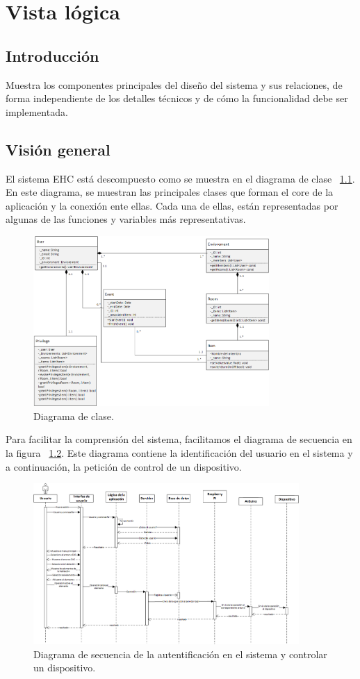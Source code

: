 \chapter{Vista l\'ogica}
\section{Introducci\'on}
Muestra los componentes principales del dise\~no del sistema y sus relaciones, de forma independiente de los detalles técnicos y de c\'omo la funcionalidad debe ser implementada. 

\section{Visión general}
El sistema EHC está descompuesto como se muestra en el diagrama de clase ~\ref{fig:diagramaClase}. En este diagrama, se muestran las principales clases que forman el core de la aplicación y la conexión ente ellas. Cada una de ellas, están representadas por algunas de las funciones y variables más representativas.

\begin{figure}
	\centering
	\includegraphics[width=0.8\textwidth]{4.Disenio/Imagenes/diagramaClase}
	\caption{Diagrama de clase.}
	\label{fig:diagramaClase}
\end{figure}

Para facilitar la comprensión del sistema, facilitamos el diagrama de secuencia en la figura ~\ref{fig:diagramaSecuencia}. Este diagrama contiene la identificación del usuario en el sistema y a continuación, la petición de control de un dispositivo. 

\begin{figure}[h!]
	\centering
	\includegraphics[width=0.9\textwidth]{4.Disenio/Imagenes/DisenioEHC}
	\caption{Diagrama de secuencia de la autentificaci\'on en el sistema y controlar un dispositivo.}
	\label{fig:diagramaSecuencia}
\end{figure}


